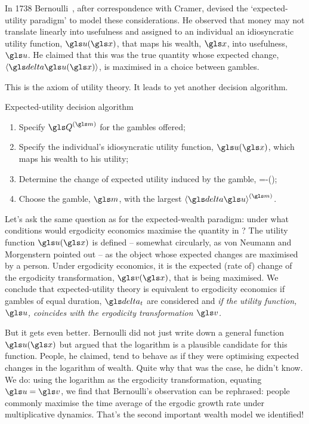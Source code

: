 In 1738 Bernoulli~\cite{Bernoulli1738}, after correspondence with Cramer, devised 
the `expected-utility paradigm' to model these considerations. He observed that 
money may not translate linearly into usefulness and assigned to an individual 
an idiosyncratic utility function, $\gu(\x)$, that maps his wealth, $\x$, 
into usefulness, $\gu$. He claimed that this was the true quantity whose expected change,
 $\ave{\d\gu(\x)}$, is maximised in a choice between gambles.

This is the axiom of utility theory. It leads to yet another decision algorithm.
\begin{keypts}{Expected-utility decision algorithm}
\begin{enumerate}
\item Specify $\Q^{(\m)}$ for the gambles offered;
\item Specify the individual's idiosyncratic utility function, $\gu(\x)$, which maps his wealth to his utility;
\item Determine the change of expected utility induced by the gamble,
\be
\ave{\d\gu}=\ave{\gu\left(\x+\q^{(\m)}\right)}-\gu(\x);
\ee
\item Choose the gamble, $\m$, with the largest $\ave{\d\gu}^{(\m)}$.
\end{enumerate}
\end{keypts}

Let's ask the same question as for the expected-wealth paradigm: under what conditions
would ergodicity economics maximise the quantity in ?
The utility function $\gu(\x)$ is defined -- somewhat circularly, as \eg von Neumann and Morgenstern pointed out 
\cite[p.~28]{vonNeumannMorgenstern1944} -- as the object whose expected changes are maximised by a person.
Under ergodicity economics, it is the expected (rate of) change of the ergodicity transformation, $\gv(\x)$, that is being maximised. 
We conclude that expected-utility theory is equivalent to ergodicity economics if gambles of equal duration, $\dt$ are considered
and {\it if the utility function, $\gu$, coincides with the ergodicity transformation $\gv$.}

But it gets even better. Bernoulli did not just write down a general function $\gu(\x)$ but argued
that the logarithm is a plausible candidate for this function. People, he claimed, tend to behave
as if they were optimising expected changes in the logarithm of wealth. Quite why that was the case, he didn't know.
We do: using the logarithm as the ergodicity transformation, \ie equating $\gu=\gv$,
we find that Bernoulli's observation can be rephrased: people commonly maximise the time average of the ergodic growth rate under multiplicative dynamics.
That's the second important wealth model we identified!

